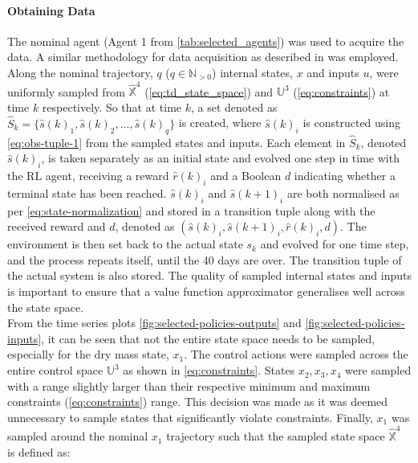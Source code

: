 \paragraph{Obtaining Data}
The nominal agent (Agent 1 from \autoref{tab:selected_agents}) was used to acquire the data. A similar methodology for data acquisition as described in \citet{linReinforcementLearningBasedModel2023} was employed. Along the nominal trajectory, $q$ ($q \in \mathbb{N}_{>0}$) internal states, $x$ and inputs $u$, were uniformly sampled from $\hat{\mathbb{X}}^4$ (\autoref{eq:td_state_space}) and ${\mathbb{U}}^3$ (\autoref{eq:constraints}) at time $k$ respectively. So that at time $k$, a set denoted as $\hat{S}_{k} = \{\hat{s}(k)_1,\hat{s}(k)_2,...,\hat{s}(k)_q \}$ is created, where $\hat{s}(k)_i$ is constructed using \autoref{eq:obs-tuple-1} from the sampled states and inputs. Each element in $\hat{S}_k$, denoted $\hat{s}(k)_i$, is taken separately as an initial state and evolved one step in time with the RL agent, receiving a reward $\hat{r}(k)_i$ and a Boolean $d$ indicating whether a terminal state has been reached. $\hat{s}(k)_i$ and $\hat{s}(k+1)_i$ are both normalised as per \autoref{eq:state-normalization} and stored in a transition tuple along with the received reward and $d$, denoted as $(\hat{s}(k)_i,\hat{s}(k+1)_i,\hat{r}(k)_i,d)$. The environment is then set back to the actual state $s_k$ and evolved for one time step, and the process repeats itself, until the 40 days are over. The transition tuple of the actual system is also stored. The quality of sampled internal states and inputs is important to ensure that a value function approximator generalises well across the state space. \\
From the time series plots \autoref{fig:selected-policies-outputs} and \autoref{fig:selected-policies-inputs}, it can be seen that not the entire state space needs to be sampled, especially for the dry mass state, $x_1$. The control actions were sampled across the entire control space $\mathbb{U}^3$ as shown in \autoref{eq:constraints}. States $x_2,x_3,x_4$ were sampled with a range slightly larger than their respective minimum and maximum constraints (\autoref{eq:constraints}) range. This decision was made as it was deemed unnecessary to sample states that significantly violate constraints. Finally, $x_1$ was sampled around the nominal $x_1$ trajectory such that the sampled state space $\hat{\mathbb{X}}^4$ is defined as:



